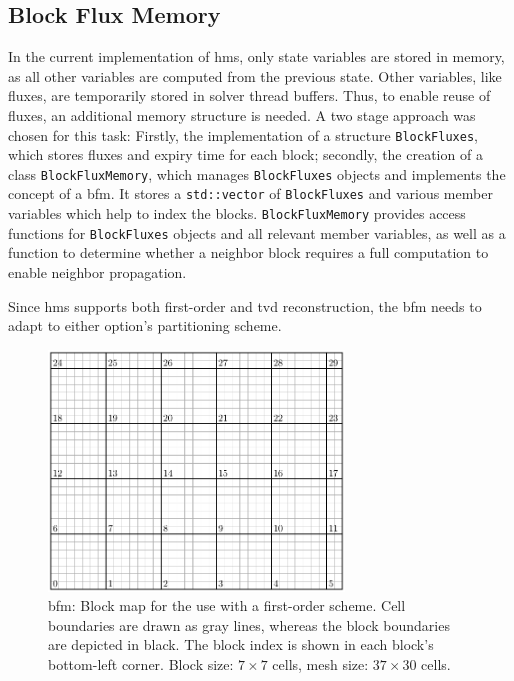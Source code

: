\subsection{Block Flux Memory}\label{sec:memory-structure}

In the current implementation of \gls{hms}, only state variables are stored in memory, as all other variables are computed from the previous state. 
Other variables, like fluxes, are temporarily stored in solver thread buffers.
Thus, to enable reuse of fluxes, an additional memory structure is needed.
A two stage approach was chosen for this task:
Firstly, the implementation of a structure \texttt{BlockFluxes}, which stores fluxes and expiry time for each block;
secondly, the creation of a class \texttt{BlockFluxMemory}, which manages \texttt{BlockFluxes} objects and implements the concept of a \acrlong{bfm}. 
It stores a \texttt{std::vector} of \texttt{BlockFluxes} and various member variables which help to index the blocks. 
\texttt{BlockFluxMemory} provides access functions for \texttt{BlockFluxes} objects and all relevant member variables, as well as a function to determine whether a neighbor block requires a full computation to enable neighbor propagation.

Since \gls{hms} supports both first-order and \gls{tvd} reconstruction, the \acrlong{bfm} needs to adapt to either option's partitioning scheme.

\begin{figure}[!b]
  \centering
  \includegraphics[width=0.7\textwidth]{../typst/bfm-index/bfm-index-fo.pdf}
  \caption[\Acrlong{bfm}: Block map for first-order scheme]{
    \Acrlong{bfm}: Block map for the use with a first-order scheme.
    Cell boundaries are drawn as gray lines, whereas the block boundaries are depicted in black.
    The block index is shown in each block's bottom-left corner.
    Block size: $7 \times 7$ cells, mesh size: $37 \times 30$ cells.
  }
  \label{fig:bfm-index-fo}
\end{figure}


